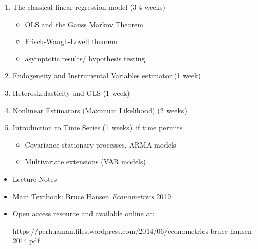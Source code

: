 \documentclass[notes=show]{beamer}
\begin{document}
\begin{frame}%


\begin{enumerate}
\item The classical linear regression model (3-4 weeks)

\begin{itemize}
\item OLS and the Gauss Markov Theorem

\item Frisch-Waugh-Lovell theorem

\item asymptotic results/ hypothesis testing.
\end{itemize}

\item Endogeneity and Instrumental Variables estimator (1 week)

\item Heteroskedasticity and GLS (1 week)

\item Nonlinear Estimators (Maximum Likelihood) (2 weeks)

\item Introduction to Time Series (1 weeks)\ if time permits

\begin{itemize}
\item Covariance stationary processes, ARMA models

\item Multivariate extensions (VAR models)
\end{itemize}
\end{enumerate}

\end{frame}%

\begin{frame}%


\begin{itemize}
\item Lecture Notes

\item Main Textbook: Bruce Hansen \textit{Econometrics} 2019

\item Open access resource and available online at:

https://perhuaman.files.wordpress.com/2014/06/econometrics-bruce-hansen-2014.pdf
\end{itemize}

\end{frame}%
\end{document}

